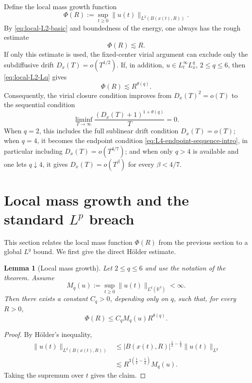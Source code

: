 \documentclass[10pt,a4paper]{amsart}
\numberwithin{equation}{section}
\newtheorem{lemma}[theorem]{Lemma}
\newcommand{\R}{\mathbb R}
\begin{document}
Define the local mass growth function
\begin{equation*}
  \Phi(R):=\sup_{t\ge0}\|u(t)\|_{L^2(B(x(t),R))}.
\end{equation*}
By \eqref{eq:local-L2-basic} and boundedness of the energy, one always has the rough estimate
\begin{equation*}
  \Phi(R)\lesssim R.
\end{equation*}
If only this estimate is used, the fixed-center virial argument can exclude only the subdiffusive drift $D_x(T)=o(T^{1/2})$. If, in addition, $u\in L_t^\infty L_x^q$, $2\le q\le6$, then \eqref{eq:local-L2-Lq} gives
\begin{equation*}
  \Phi(R)\lesssim R^{\theta(q)}.
\end{equation*}
Consequently, the virial closure condition improves from $D_x(T)^2=o(T)$ to the sequential condition
\begin{equation*}
  \liminf_{T\to\infty}
  \frac{(D_x(T)+1)^{1+\theta(q)}}{T}=0.
\end{equation*}
When $q=2$, this includes the full sublinear drift condition $D_x(T)=o(T)$; when $q=4$, it becomes the endpoint condition \eqref{eq:L4-endpoint-sequence-intro}, in particular including $D_x(T)=o(T^{4/7})$; and when only $q>4$ is available and one lets $q\downarrow4$, it gives $D_x(T)=o(T^\beta)$ for every $\beta<4/7$.

\section{Local mass growth and the standard \texorpdfstring{$L^p$}{Lp} breach}\label{sec:Lq}

This section relates the local mass function $\Phi(R)$ from the previous section to a global $L^q$ bound. We first give the direct H\"older estimate.

\begin{lemma}[Local mass growth]\label{lem:local-mass-Lq}
Let $2\le q\le6$ and use the notation of the theorem. Assume
\begin{equation*}
  M_q(u):=\sup_{t\ge0}\|u(t)\|_{L^q(\R^3)}<\infty.
\end{equation*}
Then there exists a constant $C_q>0$, depending only on $q$, such that, for every $R>0$,
\begin{equation*}
  \Phi(R)
  \le C_q M_q(u)R^{\theta(q)}.
\end{equation*}
\end{lemma}

\begin{proof}
By H\"older's inequality,
\begin{align*}
  \|u(t)\|_{L^2(B(x(t),R))}
  &\le |B(x(t),R)|^{\frac12-\frac1q}\|u(t)\|_{L^q}\\
  &\lesssim R^{3(\frac12-\frac1q)}M_q(u).
\end{align*}
Taking the supremum over $t$ gives the claim.
\end{proof}
\end{document}
